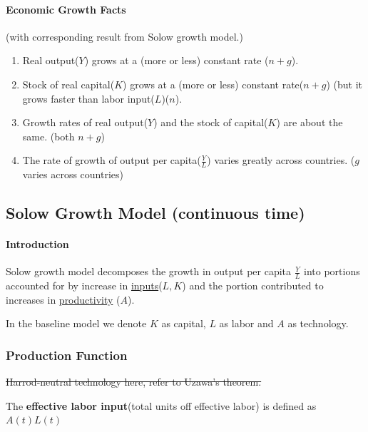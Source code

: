 \documentclass[11pt]{article}
\begin{document}
        \paragraph{Economic Growth Facts}(with corresponding result from Solow growth model.)
        \begin{enumerate}
            \item Real output($Y$) grows at a (more or less) constant rate ($n+g$).
            \item Stock of real capital($K$) grows at a (more or less) constant rate($n+g$) (but it grows faster than labor input($L$)($n$).
            \item Growth rates of real output($Y$) and the stock of capital($K$) are about the same. (both $n+g$)
            \item The rate of growth of output per capita($\frac{Y}{L}$) varies greatly across countries. ($g$ varies across countries)
        \end{enumerate}
        
        \subsection{Solow Growth Model (continuous time)}
            \paragraph{Introduction} Solow growth model decomposes the growth in output per capita $\frac{Y}{L}$ into portions accounted for by increase in \ul{inputs}($L, K$) and the portion contributed to increases in \ul{productivity} ($A$).
           
            \begin{notation}
            		In the baseline model we denote $K$ as capital, $L$ as labor and $A$ as technology.
            \end{notation}
            
        \subsubsection{Production Function}
            \begin{remark}
                \st{Harrod-neutral technology here, refer to Uzawa's theorem.}
            \end{remark}
            \begin{definition}
                The \textbf{effective labor input}(total units off effective labor) is defined as $A(t)L(t)$
            \end{definition}
            
\end{document}
